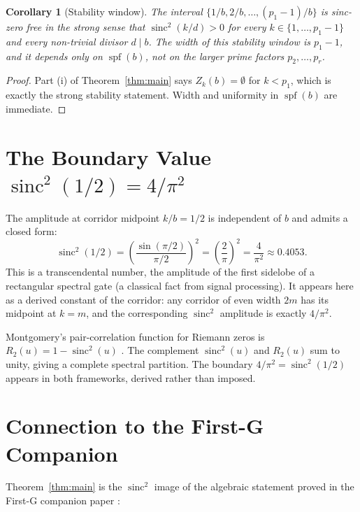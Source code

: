 \documentclass[11pt,reqno]{amsart}
\theoremstyle{plain}
\newtheorem{corollary}[theorem]{Corollary}
\theoremstyle{remark}
\DeclareMathOperator{\sinc}{sinc}
\DeclareMathOperator{\spf}{spf}
\begin{document}
\begin{corollary}[Stability window]\label{cor:stab}
The interval $\{1/b, 2/b, \ldots, (p_1 - 1)/b\}$ is sinc-zero free
in the strong sense that $\sinc^2(k/d) > 0$ for every
$k \in \{1, \ldots, p_1 - 1\}$ and every non-trivial divisor
$d \mid b$. The width of this stability window is $p_1 - 1$, and
it depends only on $\spf(b)$, not on the larger prime factors
$p_2, \ldots, p_r$.
\end{corollary}

\begin{proof}
Part (i) of Theorem~\ref{thm:main} says $Z_k(b) = \emptyset$ for
$k < p_1$, which is exactly the strong stability statement.
Width and uniformity in $\spf(b)$ are immediate.
\end{proof}

\section{The Boundary Value $\sinc^2(1/2) = 4/\pi^2$}\label{sec:boundary}

The amplitude at corridor midpoint $k/b = 1/2$ is independent of
$b$ and admits a closed form:
\begin{equation}\label{eq:fourpi2}
  \sinc^2(1/2) = \left( \frac{\sin(\pi/2)}{\pi/2} \right)^{\!2}
              = \left( \frac{2}{\pi} \right)^{\!2}
              = \frac{4}{\pi^2} \approx 0.4053.
\end{equation}
This is a transcendental number, the amplitude of the first
sidelobe of a rectangular spectral gate (a classical fact from
signal processing). It appears here as a derived constant of the
corridor: any corridor of even width $2m$ has its midpoint at
$k = m$, and the corresponding $\sinc^2$ amplitude is exactly
$4/\pi^2$.

Montgomery's pair-correlation function for Riemann zeros is
$R_2(u) = 1 - \sinc^2(u)$ \cite{Montgomery1973}. The complement
$\sinc^2(u)$ and $R_2(u)$ sum to unity, giving a complete spectral
partition. The boundary $4/\pi^2 = \sinc^2(1/2)$ appears in both
frameworks, derived rather than imposed.

\section{Connection to the First-G Companion}\label{sec:firstG}

Theorem~\ref{thm:main} is the $\sinc^2$ image of the algebraic
statement proved in the First-G companion paper \cite{J04}:
\end{document}
